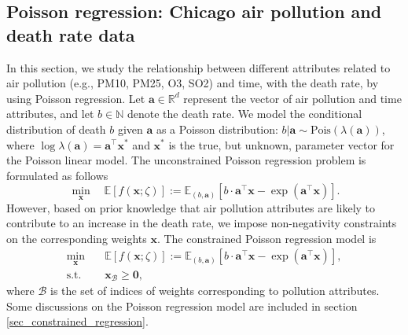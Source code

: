 \documentclass[aos]{imsart}
\numberwithin{equation}{section}
\theoremstyle{plain}
\begin{document}
\subsection{Poisson regression: Chicago air pollution and death rate data}
\label{sec:poisson_regression}
In this section, we study the relationship between different attributes related to air pollution (e.g., PM10, PM25, O3, SO2) and time, with the death rate, by using Poisson regression. 
Let $\bm{a} \in \mathbb{R}^{d}$ represent the vector of air pollution and time attributes, and let $b \in \mathbb{N}$ denote the death rate.
We model the conditional distribution of death $b$ given $\bm{a}$ as a Poisson distribution: $b|\bm{a}  \sim \text{Pois}(\lambda(\bm{a} ))$, where $\log \lambda(\bm{a}) = \bm{a}^{\top} \bm{x}^{*}$ and $\bm{x}^{*}$ is the true, but unknown, parameter vector for the Poisson linear model.
The unconstrained Poisson regression problem is formulated as follows 
    \begin{equation}
    \label{poisson_unconstrained}
            \min_{\bm{x}} \hspace{1em} \mathbb{E} \left[f(\bm{x};\zeta) \right] := \mathbb{E}_{(b,\bm{a})} \left[ b \cdot \bm{a}^{\top} \bm{x} - \exp \left(\bm{a}^{\top} \bm{x} \right) \right].
    \end{equation}
However, based on prior knowledge that air pollution attributes are likely to contribute to an increase in the death rate, we impose non-negativity constraints on the corresponding weights $\bm{x}$.
The constrained Poisson regression model is
\begin{equation}
 \label{poisson_constrained}
        \begin{split}
            \min_{\bm{x}} &  \hspace{1em} \mathbb{E} \left[f(\bm{x};\zeta) \right] := \mathbb{E}_{(b,\bm{a})} \left[ b \cdot \bm{a}^{\top} \bm{x} - \exp \left(\bm{a}^{\top} \bm{x} \right) \right], \\
            \text{s.t.} & \hspace{1em} \bm{x}_{\mathcal{B}} \geq \bm{0},
        \end{split}
    \end{equation}
    where $\mathcal{B}$ is the set of indices of weights corresponding to pollution attributes. 
    Some discussions on the Poisson regression model are included in section \ref{sec_constrained_regression}.
\end{document}
